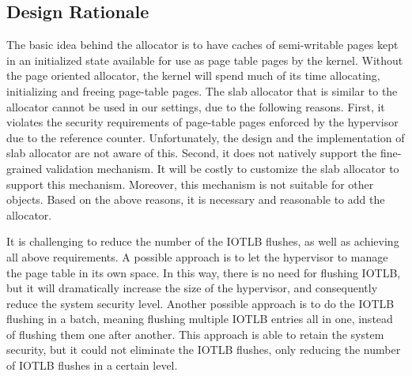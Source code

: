 \subsection{Design Rationale}\label{sec:rationale}
The basic idea behind the \name allocator is to have caches of semi-writable pages kept in an initialized state available for use as page table pages by the kernel. 
Without the page oriented \name allocator, the kernel will spend much of its time allocating, initializing and freeing page-table pages. 
The slab allocator that is similar to the \name allocator cannot be used in our settings, due to the following reasons.
First, it violates the security requirements of page-table pages enforced by the hypervisor due to the reference counter.
Unfortunately, the design and the implementation of slab allocator are not aware of this.
Second, it does not natively support the fine-grained validation mechanism.
It will be costly to customize the slab allocator to support this mechanism. Moreover, this mechanism is not suitable for other objects. 
Based on the above reasons, it is necessary and reasonable to add the \name allocator.



It is challenging to reduce the number of the IOTLB flushes, as well as achieving all above requirements.
A possible approach is to let the hypervisor to manage the page table in its own space.
In this way, there is no need for flushing IOTLB, but it will dramatically increase the size of the hypervisor, and consequently reduce the system security level.
Another possible approach is to do the IOTLB flushing in a batch, meaning flushing multiple IOTLB entries all in one, instead of flushing them one after another.
This approach is able to retain the system security, but it could not eliminate the IOTLB flushes, only reducing the number of IOTLB flushes in a certain level.

